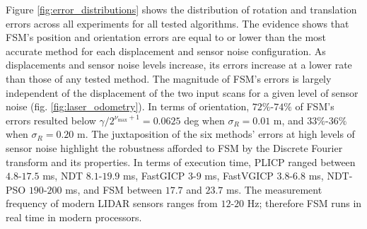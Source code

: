 \begin{figure*}
  \vspace{0.2cm}
  \begin{framed}
  \vspace{-0.75cm}\hspace{-0.75cm}
    \subfloat{}
    \qquad \hspace{-1.25cm}
    \subfloat{}
    \vspace{-2.5cm}
    \caption{\small Distributions of orientation and position errors across a
             range of maximal positional and orientational displacements, for
             progressively larger sensor measurement noise levels sd. Each
             box represents the statistics of each method for $E = 10$
             iterations over $\sum|D_k| \approx 45$$\cdot$$10^3$ random scan
             pairs for each configuration, where $k=1,\dots,5$ is the dataset
             index. Dots signify mean errors. FSM's errors are largely
             independent of the initial displacement of scans for a given level
             of sensor noise}%
    \label{fig:error_distributions}%
\end{framed}
\end{figure*}

Figure \ref{fig:error_distributions} shows the distribution of rotation and
translation errors across all experiments for all tested algorithms. The
evidence shows that FSM's position and orientation errors are equal to or lower
than the most accurate method for each displacement and sensor noise
configuration. As displacements and sensor noise levels increase, its errors
increase at a lower rate than those of any tested method. The magnitude of
FSM's errors is largely independent of the displacement of the two input scans
for a given level of sensor noise (fig.  \ref{fig:laser_odometry}). In terms of
orientation, $72\%$-$74\%$ of FSM's errors resulted below $\gamma /
2^{\nu_{\max}+1} = 0.0625$ deg when $\sigma_R = 0.01$ m, and $33\%$-$36\%$ when
$\sigma_R = 0.20$ m.  The juxtaposition of the six methods' errors at high
levels of sensor noise highlight the robustness afforded to FSM by the Discrete
Fourier transform and its properties.  In terms of execution time, PLICP ranged
between $4.8$-$17.5$ ms, NDT $8.1$-$19.9$ ms, FastGICP $3$-$9$ ms, FastVGICP
$3.8$-$6.8$ ms, NDT-PSO $190$-$200$ ms, and FSM between $17.7$ and $23.7$ ms.
The measurement frequency of modern LIDAR sensors ranges from $12$-$20$ Hz;
therefore FSM runs in real time in modern processors.
